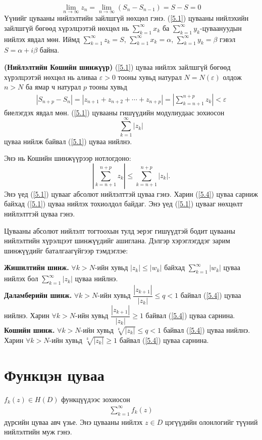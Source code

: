 $$\lim\limits_{n\rightarrow \infty}z_n=\lim\limits_{n\rightarrow \infty} (S_n-S_{n-1})=S-S=0$$
Үүнийг цувааны нийлэлтийн зайлшгүй нөхцөл гэнэ. (\ref{5.1}) цувааны нийлэхийн зайлшгүй бөгөөд хүрэлцээтэй нөхцөл нь $\sum\limits_{k=1}^\infty x_k$ ба $\sum\limits_{k=1}^\infty y_k$-цуваануудын нийлэх явдал мөн. Иймд $\sum\limits_{k=1}^\infty z_k=S$, $\sum\limits_{k=1}^\infty x_k=\alpha$, $\sum\limits_{k=1}^\infty y_k=\beta$ гэвэл $S=\alpha +i\beta$ 
байна.
\begin{thm}
\textbf{(Нийлэлтийн Кошийн шинжүүр) }  (\ref{5.1}) цуваа нийлэх зайлшгүй бөгөөд хүрэлцээтэй нөхцөл нь аливаа $\varepsilon >0$ тооны хувьд натурал $N=N(\varepsilon)$ олдож $n>N$ ба ямар ч натурал $p$ тооны хувьд
\begin{eqnarray}
   |S_{n+p}-S_n|=|z_{n+1}+z_{n+2}+\cdots +z_{n+p}|=\left|\sum_{k=n+1}^{n+p}z_k\right| <\varepsilon
\end{eqnarray}
биелэгдэх явдал мөн. (\ref{5.1}) цувааны гишүүдийн модулиудаас зохиосон
\begin{equation} \label{5.4}
    \sum\limits_{k=1}^\infty |z_k|
\end{equation}
цуваа нийлж байвал (\ref{5.1}) цуваа нийлнэ.

Энэ нь Кошийн шинжүүрээр нотлогдоно:
$$\left|\sum_{k=n+1}^{n+p}z_k\right|\leq \sum_{k=n+1}^{n+p}|z_k|.$$
Энэ үед (\ref{5.1}) цувааг абсолют нийлэлттэй цуваа гэнэ. Харин (\ref{5.4}) цуваа сарниж байхад (\ref{5.1}) цуваа нийлэх тохиолдол байдаг. Энэ үед (\ref{5.1}) цувааг нөхцөлт нийлэлттэй цуваа гэнэ.

Цувааны абсолют нийлэлт тогтоохын тулд эерэг гишүүдтэй бодит цувааны нийлэлтийн хүрэлцээт шинжүүдийг ашиглана. Дэлгэр хэрэглэгддэг зарим шинжүүдийг баталгаагүйгээр тэмдэглэе:
\end{thm} 
\textbf{Жишилтийн шинж.} $\forall k>N$-ийн хувьд $|z_k|\leq |w_k|$ байхад $\sum\limits_{k=1}^\infty |w_k|$ цуваа нийлэх бол $\sum\limits_{k=1}^\infty |z_k|$ цуваа нийлнэ.\\
\textbf{Даламберийн шинж.} $\forall k>N$-ийн хувьд $\dfrac{|z_{k+1}|}{|z_k|}\leq q<1$ байвал (\ref{5.4}) цуваа нийлнэ. Харин $\forall k>N$-ийн хувьд $\dfrac{|z_{k+1}|}{|z_k|}\geq 1$  байвал (\ref{5.4}) цуваа сарнина. \\
\textbf{Кошийн шинж.} $\forall k>N$-ийн хувьд $\sqrt[k]{|z_k|}\leq q<1$ байвал (\ref{5.4}) цуваа нийлнэ. Харин $\forall k>N$-ийн хувьд $\sqrt[k]{|z_k|}\geq 1$ байвал (\ref{5.4}) цуваа сарнина.
\section{Функцэн цуваа} 
$f_k(z)\in H(D)$ функцүүдээс зохиосон
\begin{eqnarray} \label{5.5}
   \sum\limits_{k=1}^\infty f_k(z)
\end{eqnarray}
дүрсийн цуваа авч үзье. Энэ цувааны нийлэх $z\in D$ цэгүүдийн олонлогийг түүний нийлэлтийн муж гэнэ. 

